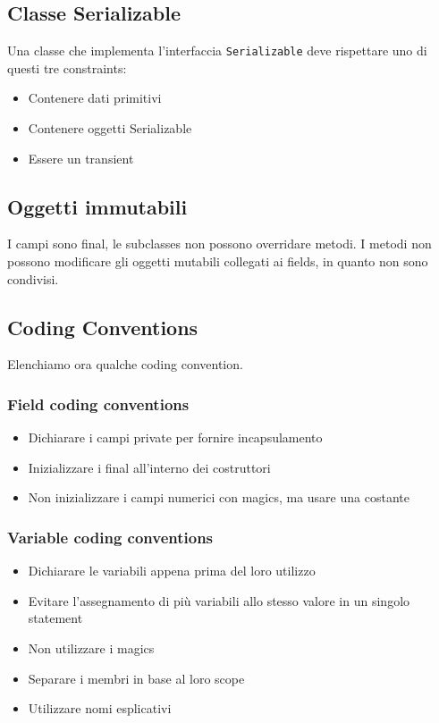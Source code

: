 \documentclass[11pt]{article}
\newcommand{\code}[1]{\texttt{#1}}
\begin{document}
\subsection{Classe Serializable}
Una classe che implementa l'interfaccia \code{Serializable} deve rispettare uno di questi tre constraints:
\begin{itemize}
    \item Contenere dati primitivi
    \item Contenere oggetti Serializable
    \item Essere un transient 
\end{itemize}
\subsection{Oggetti immutabili}
I campi sono final, le subclasses non possono overridare metodi. I metodi non possono modificare gli oggetti mutabili collegati ai fields, in quanto non sono condivisi. 
\subsection{Coding Conventions}
Elenchiamo ora qualche coding convention.
\subsubsection{Field coding conventions}
\begin{itemize}
    \item Dichiarare i campi private per fornire incapsulamento
    \item Inizializzare i final all'interno dei costruttori
    \item Non inizializzare i campi numerici con \glspl{magic}, ma usare una costante
\end{itemize}
\subsubsection{Variable coding conventions}
\begin{itemize}
    \item Dichiarare le variabili appena prima del loro utilizzo
    \item Evitare l'assegnamento di più variabili allo stesso valore in un singolo statement
    \item Non utilizzare i \glspl{magic}
    \item Separare i membri in base al loro scope 
    \item Utilizzare nomi esplicativi
\end{itemize}
\end{document}
